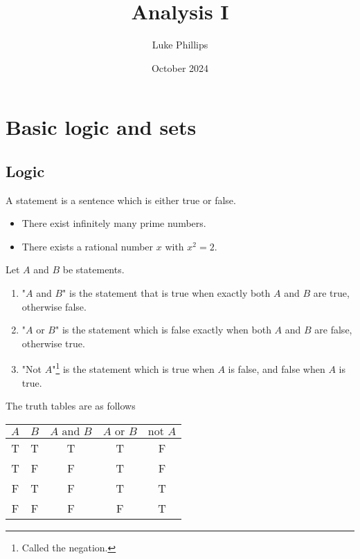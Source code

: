 \documentclass[10pt, a4paper]{article}
\title{Analysis I}
\author{Luke Phillips}
\date{October 2024}
\begin{document}
\maketitle

\newpage

\section{Basic logic and sets}

\subsection{Logic}
\begin{definition}
    A statement is a sentence which is either true or false.
\end{definition}
\begin{example}
    \phantom{}
    \begin{itemize}
        \item There exist infinitely many prime numbers.
        \item There exists a rational number $x$ with $x ^ 2 = 2$.
    \end{itemize}
\end{example}

\begin{definition}
    Let $A$ and $B$ be statements.
    \begin{enumerate}[label = (\alph*)]
        \item "$A$ and $B$" is the statement that is true when exactly both $A$ and $B$ are true, otherwise false.
        \item "$A$ or $B$" is the statement which is false exactly when both $A$ and $B$ are false, otherwise true.
        \item "Not $A$"\footnote{Called the negation.} is the statement which is true when $A$ is false, and false when $A$ is true.
    \end{enumerate}

    The truth tables are as follows 
    \begin{table}[H]
        \centering
        \begin{tabular}{|c|c|c|c|c|}
            \hline
            $A$ & $B$ & $A \text{ and } B$ & $A \text{ or } B$ & $\text{not } A$ \\
            \hline
            T & T & T & T & F \\
            T & F & F & T & F \\
            F & T & F & T & T \\
            F & F & F & F & T \\
            \hline
        \end{tabular}
        \label{tab:Gr6}
    \end{table}
\end{definition}
\end{document}
